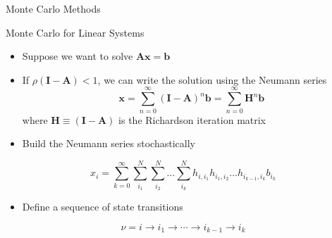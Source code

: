 \documentclass{beamer}
\begin{document}
\begin{frame}

  \center Monte Carlo Methods
  
\end{frame}

\begin{frame}{Monte Carlo for Linear Systems}
  \begin{itemize}
    \item Suppose we want to solve $\mathbf{Ax}=\mathbf{b}$
    \vfill
    \item If $\rho(\mathbf{I-A})<1$, we can write the solution using the
      Neumann series
      \begin{equation*}
        \mathbf{x} = \sum_{n=0}^{\infty} (\mathbf{I-A})^n \mathbf{b}
         = \sum_{n=0}^{\infty} \mathbf{H}^n \mathbf{b}
      \end{equation*}
      where $\mathbf{H} \equiv ( \mathbf{I-A} )$ is the Richardson
      iteration matrix 
      \vfill
    \item Build the Neumann series stochastically
  \end{itemize}

  \[
  x_i = \sum_{k=0}^{\infty}\sum_{i_1}^{N}\sum_{i_2}^{N}\ldots
  \sum_{i_k}^{N}h_{i,i_1}h_{i_1,i_2}\ldots h_{i_{k-1},i_k}b_{i_k}
  \]

  \begin{itemize}
  \item Define a sequence of state transitions
  \end{itemize}
  \vspace*{-0.1in}
  \[
  \nu = i \rightarrow i_1 \rightarrow \cdots \rightarrow i_{k-1}
  \rightarrow i_{k}
  \]

\end{frame}
\end{document}
